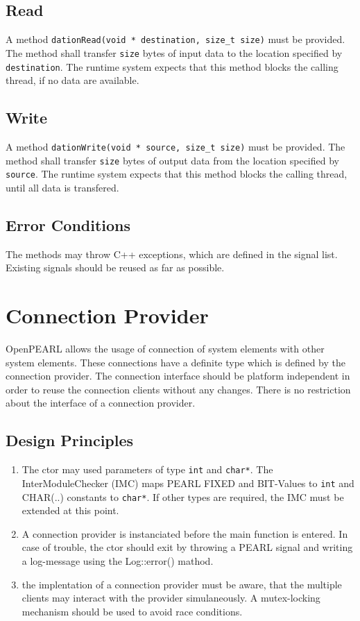 \subsection{Read}
A method \verb|dationRead(void * destination, size_t size)|
must be provided. The method shall transfer \verb|size| bytes of
input data to the location specified by \verb|destination|.
The runtime system expects that this method blocks the calling thread,
if no data are available.

\subsection{Write}
A method \verb|dationWrite(void * source, size_t size)|
must be provided. The method shall transfer \verb|size| bytes of
output data from the location specified by \verb|source|.
The runtime system expects that this method blocks the calling thread,
until all data is transfered.

\subsection{Error Conditions}
The methods may throw C++ exceptions, which are defined in the signal list.
Existing signals should be reused as far as possible.

\section{Connection Provider}
OpenPEARL allows the usage of connection of system elements  with other 
system elements. These connections have a definite type which is defined
by the connection provider.
The connection interface should be platform independent in order to reuse
the connection clients without any changes. 
There is no restriction about the interface of a connection provider.  

\subsection{Design Principles}
\begin{enumerate}
\item The ctor may used parameters of type \verb|int| and \verb|char*|.
  The InterModuleChecker (IMC) maps PEARL FIXED and BIT-Values to \verb|int|
  and CHAR(..) constants to \verb|char*|.
  If other types are required, the IMC must be extended at this point.
\item A connection provider is instanciated before the main function
  is entered. In case of trouble, the ctor should exit by throwing a 
  PEARL signal and writing a log-message using the Log::error()  mathod.
\item the implentation of a connection provider must be aware, that 
   the multiple clients may interact with the provider simulaneously.
   A mutex-locking mechanism should be used to avoid race conditions.
\end{enumerate}

